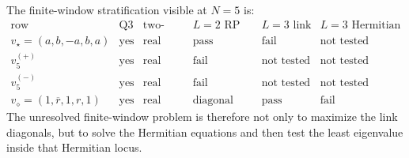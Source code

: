 \begin{principle}
\label{prin:innovation-input-pentary-search-stratification}
The finite-window stratification visible at $N=5$ is:
$$
\begin{array}{c|c|c|c|c|c}
\text{row} & \text{Q3} & \text{two-point} & L=2\text{ RP} &
L=3\text{ link} & L=3\text{ Hermitian}\\
\hline
v_\star=(a,b,-a,b,a) &
\text{yes} & \text{real} & \text{pass} &
\text{fail} & \text{not tested}\\
v_5^{(+)} &
\text{yes} & \text{real} & \text{fail} &
\text{not tested} & \text{not tested}\\
v_5^{(-)} &
\text{yes} & \text{real} & \text{fail} &
\text{not tested} & \text{not tested}\\
v_\diamond=(1,\overline r,1,r,1) &
\text{yes} & \text{real} & \text{diagonal pass} &
\text{pass} & \text{fail}
\end{array}
$$
The unresolved finite-window problem is therefore not only to maximize
the link diagonals, but to solve the Hermitian equations and then test
the least eigenvalue inside that Hermitian locus.
\end{principle}
